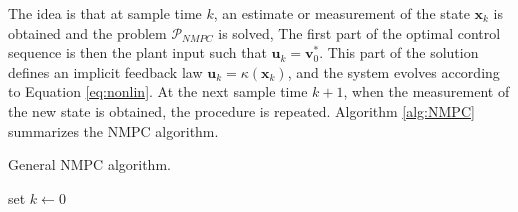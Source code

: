 \par
The idea is that at sample time $k$, an estimate or measurement of the state $\boldsymbol{x}_k$ is obtained and the problem $\mathcal{P}_{NMPC}$ is solved,
The first part of the optimal control sequence is then the plant input such that $\boldsymbol{u}_k=\boldsymbol{v}_0^*$.
This part of the solution defines an implicit feedback law $\boldsymbol{u}_k=\kappa(\boldsymbol{x}_k)$, and the system evolves according to Equation \ref{eq:nonlin}.
At the next sample time $k+1$, when the measurement of the new state is obtained, the procedure is repeated.
Algorithm \ref{alg:NMPC} summarizes the NMPC algorithm.\\
\begin{algorithm}[H]
 \caption{General NMPC algorithm.}
 \label{alg:NMPC}
	\SetAlgoLined
	set $k\leftarrow 0$\\
\end{algorithm}
